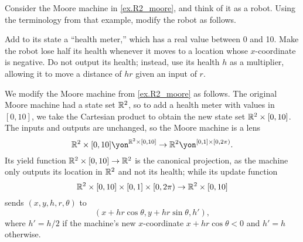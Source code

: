 \documentclass[Book-Poly]{subfiles}
\begin{document}
\begin{exercise}
Consider the Moore machine in \cref{ex.R2_moore}, and think of it as a robot. Using the terminology from that example, modify the robot as follows.

Add to its state a ``health meter,'' which has a real value between 0 and 10. Make the robot lose half its health whenever it moves to a location whose $x$-coordinate is negative. Do not output its health; instead, use its health $h$ as a multiplier, allowing it to move a distance of $hr$ given an input of $r$.
\begin{solution}
We modify the Moore machine from \cref{ex.R2_moore} as follows.
The original Moore machine had a state set $\mathbb{R}^2$, so to add a health meter with values in $[0,10]$, we take the Cartesian product to obtain the new state set $\mathbb{R}^2 \times [0,10]$.
The inputs and outputs are unchanged, so the Moore machine is a lens
\[
    \rr^2 \times [0,10] \yon^{\rr^2 \times [0,10]} \to \rr^2 \yon^{[0,1] \times [0,2\pi)}.
\]
Its yield function $\mathbb{R}^2 \times [0,10] \to \mathbb{R}^2$ is the canonical projection, as the machine only outputs its location in $\mathbb{R}^2$ and not its health; while its update function
\[
    \mathbb{R}^2 \times [0,10] \times [0,1] \times [0,2\pi) \to \mathbb{R}^2 \times [0,10]
\]
sends $(x, y, h, r, \theta)$ to
\[
    (x + hr\cos\theta, y + hr\sin\theta, h'),
\]
where $h' = h/2$ if the machine's new $x$-coordinate $x + hr\cos\theta < 0$ and $h' = h$ otherwise.
\end{solution}
\end{exercise}
\end{document}
